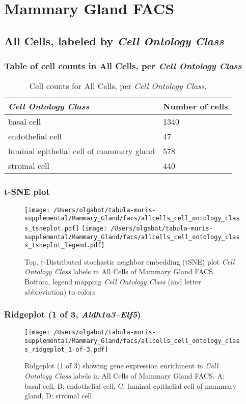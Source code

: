 \clearpage
\section{Mammary Gland FACS}

\subsection{All Cells, labeled by \emph{Cell Ontology Class}}
\subsubsection{Table of cell counts in All Cells, per \emph{Cell Ontology Class}}\begin{table}[h]
\centering
\label{my-label}
\begin{tabular}{@{}ll@{}}
\toprule

\emph{Cell Ontology Class}& Number of cells \\ \midrule
basal cell & 1340 \\

endothelial cell & 47 \\

luminal epithelial cell of mammary gland & 578 \\

stromal cell & 440 \\
\bottomrule
\end{tabular}
\caption{Cell counts for All Cells, per \emph{Cell Ontology Class}.}
\end{table}

\clearpage
\subsubsection{t-SNE plot}
\begin{figure}[h]
\centering
\texttt{[image: /Users/olgabot/tabula-muris-supplemental/Mammary\_Gland/facs/allcells\_cell\_ontology\_class\_tsneplot.pdf]}
\texttt{[image: /Users/olgabot/tabula-muris-supplemental/Mammary\_Gland/facs/allcells\_cell\_ontology\_class\_tsneplot\_legend.pdf]}
\caption{Top, t-Distributed stochastic neighbor embedding (tSNE) plot  \emph{Cell Ontology Class} labels in All Cells of Mammary Gland FACS. Bottom, legend mapping \emph{Cell Ontology Class} (and letter abbreviation) to colors}
\end{figure}


\clearpage

\subsubsection{Ridgeplot (1 of 3, \emph{Aldh1a3}--\emph{Elf5})}
\begin{figure}[h]
\centering
\texttt{[image: /Users/olgabot/tabula-muris-supplemental/Mammary\_Gland/facs/allcells\_cell\_ontology\_class\_ridgeplot\_1-of-3.pdf]}

\caption{ Ridgeplot (1 of 3)  showing gene expression enrichment in \emph{Cell Ontology Class} labels in All Cells of Mammary Gland FACS. A: basal cell, B: endothelial cell, C: luminal epithelial cell of mammary gland, D: stromal cell.}
\end{figure}


